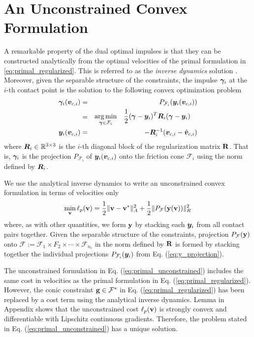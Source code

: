 \section{An Unconstrained Convex Formulation}
\label{sec:unconstrained_convex_formulation}

A remarkable property of the dual optimal impulses is that they
can be constructed analytically from the optimal velocities of the primal
formulation in \eqref{eq:primal_regularized}. This is referred to as the
\textit{inverse dynamics} solution \cite{bib:todorov2014}. Moreover, given the
separable structure of the constraints, the impulse ${\bm\gamma}_i$ at the
$i\text{-th}$ contact point is the solution to the following convex optimization
problem
\begin{eqnarray}
	\bgamma_i(\vf{v}_{c,i})&=& P_{\mathcal{F}_i}(\vf{y}_i(\vf{v}_{c,i}))
	\nonumber\\
	&=&\begin{aligned} \argmin_{\bgamma\in\mathcal{F}_i} \quad &
		\frac{1}{2}(\bgamma-\vf{y}_i)^T\vf{R}_i(\bgamma-\vf{y}_i) \end{aligned}
	\label{eq:y_projection}\\
	\vf{y}_i(\vf{v}_{c,i}) &=& -\vf{R}_i^{-1}(\vf{v}_{c,i}-\hat{\vf{v}}_{c,i})	
\end{eqnarray}
where ${\bm{R}}_i\in\mathbb{R}^{3\times3}$ is the $i\text{-th}$ diagonal block of
the regularization matrix ${\mathbf{R}}$. That is, ${\bm\gamma}_i$ is the projection
$P_{\mathcal{F}_i}$ of ${\bm{y}}_i({\bm{v}}_{c,i})$ onto the friction cone
$\mathcal{F}_i$ using the norm defined by ${\bm{R}}_i$.

We use the analytical inverse dynamics to write an unconstrained convex
formulation in terms of velocities only
\begin{eqnarray}
	\min_{\mf{v}} \ell_p(\mf{v}) = \frac{1}{2}\Vert\mf{v}-\mf{v}^*\Vert_{A}^2 +
	\frac{1}{2}\Vert P_\mathcal{F}(\mf{y}(\mf{v}))\Vert_R^2
	\label{eq:primal_unconstrained}
\end{eqnarray}
where, as with other quantities, we form ${\mathbf{y}}$ by stacking each
${\bm{y}}_i$ from all contact pairs together. Given the separable structure of the
constraints, projection $P_{\mathcal{F}}({\mathbf{y}})$ onto $\mathcal{F} :=
\mathcal{F}_1 \times F_2 \times \cdots \times \mathcal{F}_{n_c}$ in the norm
defined by ${\mathbf{R}}$ is formed by stacking together the individual projections
$P_{\mathcal{F}_i}({\bm{y}}_i)$ from Eq. (\ref{eq:y_projection}).

The unconstrained formulation in Eq. (\ref{eq:primal_unconstrained}) includes
the same cost in velocities as the primal formulation in Eq.
(\ref{eq:primal_regularized}). However, the conic constraint ${\mathbf{g}}\in
\mathcal{F}^*$ in Eq. (\ref{eq:primal_regularized}) has been replaced by a cost
term using the analytical inverse dynamics. Lemma
 in Appendix  shows
that the unconstrained cost $\ell_p({\mathbf{v}})$ is strongly convex and
differentiable with Lipschitz continuous gradients. Therefore, the problem
stated in Eq. (\ref{eq:primal_unconstrained}) has a unique solution.

